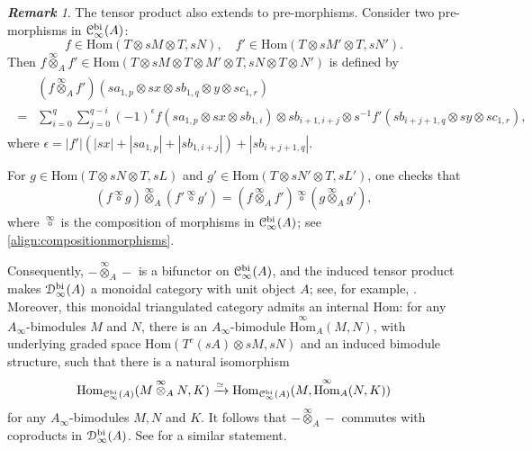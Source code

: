 \documentclass[a4paper, 11pt]{amsart}
\theoremstyle{definition}
\theoremstyle{remark}
\newtheorem{rem}[thm]{\bf Remark}
\numberwithin{equation}{section}
\newcommand{\BB}{\mathrm{bi}}
\newcommand{\Hom}{\mathrm{Hom}}
\newcommand{\EC}{\EuScript{C}}
\newcommand{\ED}{\EuScript{D}}
\begin{document}
\begin{rem}\label{rem:tensormorphism}
The tensor product also extends to pre-morphisms. Consider two pre-morphisms in $\EC^{\BB}_\infty(A)$:
\[
f\in \Hom(T \otimes sM \otimes T, sN), \quad f' \in \Hom(T \otimes sM' \otimes T, sN').
 \]
Then $f\overset{\infty}\otimes_A f'\in \Hom(T\otimes sM\otimes T\otimes M'\otimes T,sN\otimes T\otimes N')$ is defined by
 \begin{align}
 \begin{aligned}
& (f \overset{\infty}\otimes_A f') (sa_{1,p}\otimes sx\otimes sb_{1,q} \otimes y \otimes sc_{1,r})\\
 ={} & \sum_{i=0}^q\sum_{j=0}^{q-i} (-1)^{\epsilon} f(sa_{1,p} \otimes sx \otimes sb_{1,i}) \otimes sb_{i+1, i+j} \otimes s^{-1} f'(sb_{i+j+1, q} \otimes sy \otimes sc_{1,r}),
 \end{aligned}
 \end{align}
where $\epsilon=|f'|(|sx|+|sa_{1,p}|+|sb_{1,i+j}|)+|sb_{i+j+1,q}|$.

For $g\in \Hom(T\otimes sN\otimes T,sL)$ and $g'\in \Hom(T\otimes sN'\otimes T,sL')$, one checks that
\begin{align}\label{align:tensorcomposition}
 (f \overset{\infty}{\circ}g) \overset{\infty} \otimes_A (f' \overset{\infty}{\circ} g') = (f \overset{\infty} \otimes_A f') \overset{\infty}\circ (g \overset{\infty} \otimes_A g'),
\end{align}
where $\overset{\infty} \circ$ is the composition of morphisms in $\EC^{\BB}_\infty(A)$; see \eqref{align:compositionmorphisms}.


Consequently, $-\overset{\infty}\otimes_A-$ is a bifunctor on $\EC^{\BB}_\infty(A)$, and the induced tensor product makes $\ED^{\BB}_\infty(A)$ a monoidal category with unit object $A$; see, for example, \cite[Proposition 2]{Fer12}. Moreover, this monoidal triangulated category admits an internal Hom: for any $A_\infty$-bimodules $M$ and $N$, there is an $A_\infty$-bimodule $\overset{\infty}{\Hom}_A(M,N)$, with underlying graded space $\Hom(T^c(sA)\otimes sM,sN)$ and an induced bimodule structure, such that there is a natural isomorphism
\begin{align*}
\Hom_{\EC^{\BB}_\infty(A)}(M \overset{\infty}{\otimes}_A N, K) \xrightarrow{\simeq} \Hom_{\EC^{\BB}_\infty(A)}(M, \overset{\infty}{\Hom}_A(N, K))
\end{align*}
for any $A_\infty$-bimodules $M, N$ and $K$. It follows that $-\overset{\infty}{\otimes}_A-$ commutes with coproducts in $\ED^{\BB}_\infty(A)$. See \cite[Proposition 2.10]{Gan} for a similar statement.
\end{rem}
\end{document}
